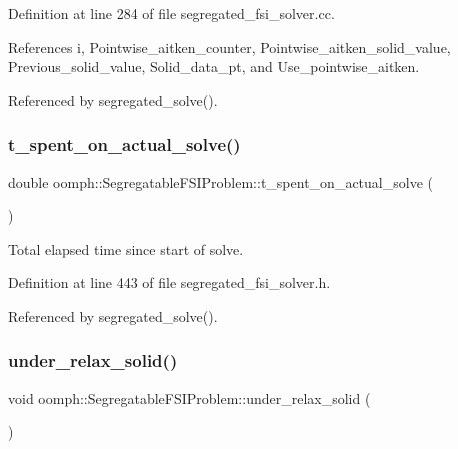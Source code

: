 Definition at line 284 of file segregated\+\_\+fsi\+\_\+solver.\+cc.



References i, Pointwise\+\_\+aitken\+\_\+counter, Pointwise\+\_\+aitken\+\_\+solid\+\_\+value, Previous\+\_\+solid\+\_\+value, Solid\+\_\+data\+\_\+pt, and Use\+\_\+pointwise\+\_\+aitken.



Referenced by segregated\+\_\+solve().

\mbox{\label{classoomph_1_1SegregatableFSIProblem_adaaaa08352182dc5e0a38c7003cb7a6b}} 
\subsubsection{\texorpdfstring{t\+\_\+spent\+\_\+on\+\_\+actual\+\_\+solve()}{t\_spent\_on\_actual\_solve()}}
{\footnotesize\ttfamily double oomph\+::\+Segregatable\+F\+S\+I\+Problem\+::t\+\_\+spent\+\_\+on\+\_\+actual\+\_\+solve (\begin{DoxyParamCaption}{ }\end{DoxyParamCaption})\hspace{0.3cm}{\ttfamily [inline]}}



Total elapsed time since start of solve. 



Definition at line 443 of file segregated\+\_\+fsi\+\_\+solver.\+h.



Referenced by segregated\+\_\+solve().

\mbox{\label{classoomph_1_1SegregatableFSIProblem_a9da3017952982a64496ff9c16ca7024c}} 
\subsubsection{\texorpdfstring{under\+\_\+relax\+\_\+solid()}{under\_relax\_solid()}}
{\footnotesize\ttfamily void oomph\+::\+Segregatable\+F\+S\+I\+Problem\+::under\+\_\+relax\+\_\+solid (\begin{DoxyParamCaption}{ }\end{DoxyParamCaption})\hspace{0.3cm}{\ttfamily [private]}}



